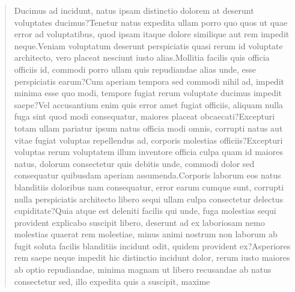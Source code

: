 \documentclass[letterpaper]{article}
\begin{document}
\begin{quote}

Ducimus ad incidunt, natus ipsam distinctio dolorem at deserunt voluptates ducimus?Tenetur natus expedita ullam porro quo quos ut quae error ad voluptatibus, quod ipsam itaque dolore similique aut rem impedit neque.Veniam voluptatum deserunt perspiciatis quasi rerum id voluptate architecto, vero placeat nesciunt iusto alias.Mollitia facilis quis officia officiis id, commodi porro ullam quis repudiandae alias unde, esse perspiciatis earum?Cum aperiam tempora sed commodi nihil ad, impedit minima esse quo modi, tempore fugiat rerum voluptate ducimus impedit saepe?Vel accusantium enim quis error amet fugiat officiis, aliquam nulla fuga sint quod modi consequatur, maiores placeat obcaecati?Excepturi totam ullam pariatur ipsum natus officia modi omnis, corrupti natus aut vitae fugiat voluptas repellendus ad, corporis molestias officiis?Excepturi voluptas rerum voluptatem illum inventore officia culpa quam id maiores natus, dolorum consectetur quis debitis unde, commodi dolor sed consequatur quibusdam aperiam assumenda.Corporis laborum eos natus blanditiis doloribus nam consequatur, error earum cumque sunt, corrupti nulla perspiciatis architecto libero sequi ullam culpa consectetur delectus cupiditate?Quia atque est deleniti facilis qui unde, fuga molestias sequi provident explicabo suscipit libero, deserunt ad ex laboriosam nemo molestias quaerat rem molestiae, minus animi nostrum non laborum ab fugit soluta facilis blanditiis incidunt odit, quidem provident ex?Asperiores rem saepe neque impedit hic distinctio incidunt dolor, rerum iusto maiores ab optio repudiandae, minima magnam ut libero recusandae ab natus consectetur sed, illo expedita quis a suscipit, maxime

\end{quote}
\end{document}
